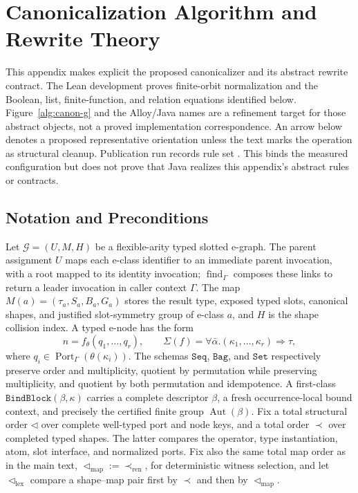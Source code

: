 
\section{Canonicalization Algorithm and Rewrite Theory}
\label{app:canon-rules}

This appendix makes explicit the proposed canonicalizer and its abstract
rewrite contract.  The Lean development proves finite-orbit normalization and
the Boolean, list, finite-function, and relation equations identified below.
Figure~\ref{alg:canon-g} and the Alloy/Java names are a refinement target for
those abstract objects, not a proved implementation correspondence.  An arrow
below denotes a proposed representative orientation unless the text marks the
operation as structural cleanup.  Publication run 
records rule set .  This binds the
measured configuration but does not prove that Java realizes this appendix's
abstract rules or contracts.

\subsection{Notation and Preconditions}

Let $\mathcal G=(U,M,H)$ be a flexible-arity typed slotted e-graph.  The parent
assignment $U$ maps each e-class identifier to an immediate parent invocation,
with a root mapped to its identity invocation;
$\operatorname{find}_\Gamma$ composes these links to return a leader invocation
in caller context $\Gamma$.  The map
$M(a)=(\tau_a,S_a,B_a,G_a)$ stores the result type, exposed typed slots,
canonical shapes, and justified slot-symmetry group of e-class $a$, and $H$ is
the shape collision index.  A typed e-node has the form
\[
  n=f_\theta(q_1,\ldots,q_r),
  \qquad
  \Sigma(f)=\forall\bar\alpha.(\kappa_1,\ldots,\kappa_r)\Rightarrow\tau,
\]
where $q_i\in\operatorname{Port}_\Gamma(\theta(\kappa_i))$.  The schemas
$\texttt{Seq}$, $\texttt{Bag}$, and $\texttt{Set}$ respectively preserve order
and multiplicity, quotient by permutation while preserving multiplicity, and
quotient by both permutation and idempotence.  A first-class
$\texttt{BindBlock}(\beta,\kappa)$ carries a complete descriptor $\beta$, a
fresh occurrence-local bound context, and precisely the certified finite group
$\operatorname{Aut}(\beta)$.  Fix a total structural order $\triangleleft$ over
complete well-typed port and node keys, and a total order $\prec$ over completed
typed shapes.  The latter compares the operator, type instantiation, atom, slot
interface, and normalized ports.  Fix also the same total map order as in
the main text,
$\triangleleft_{\mathrm{map}}:=\prec_{\mathrm{ren}}$, for deterministic witness selection, and
let $\triangleleft_{\mathrm{lex}}$ compare a shape--map pair first by
$\prec$ and then by $\triangleleft_{\mathrm{map}}$.

